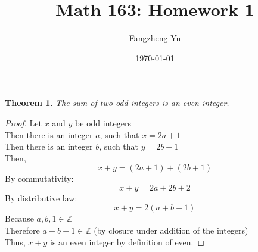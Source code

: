 \documentclass{article}
\title{Math 163: Homework 1}
\author{Fangzheng Yu}
\date{\today}
\newtheorem{theorem}{Theorem}
\begin{document}

	\maketitle
\begin{theorem}\label{thm:theTheoremIndeed}
        The sum of two odd integers is an even integer.
\end{theorem}
        \begin{proof}
                Let $x$ and $y$ be odd integers\\
                Then there is an integer \(a\), such that
                $x = 2a + 1$\\
                Then there is an integer \(b\), such that
                $y = 2b + 1$\\
                Then,
                \[x + y = (2a + 1) + (2b + 1)\]
                By commutativity:
                \[x + y = 2a + 2b + 2\]
                By distributive law:
                \[x + y = 2(a + b + 1)\]
                Because
                $a, b, 1 \in \mathbb{Z}$\\
                Therefore
                $a + b + 1 \in \mathbb{Z}$ (by closure under addition of the integers)\\
                Thus, $x + y$ is an even integer by definition of even.
        \end{proof}
\end{document}
